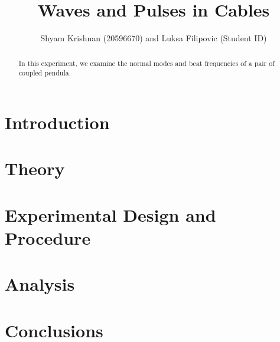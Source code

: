 \documentclass[letterpaper, 10pt, conference]{ieeeconf}
\title{\LARGE \bf Waves and Pulses in Cables}
\author{Shyam Krishnan (20596670) and Luksa Filipovic (Student ID)}
\numberwithin{equation}{section}
\begin{document}
\maketitle
\thispagestyle{empty}
\pagestyle{empty}

\begin{abstract}
In this experiment, we examine the normal modes and beat frequencies of a pair of coupled pendula. 
\end{abstract}

\section{Introduction}


\section{Theory\label{sec:theory}}


\section{Experimental Design and Procedure}


\section{Analysis}


\section{Conclusions}


\printbibliography
\end{document}
